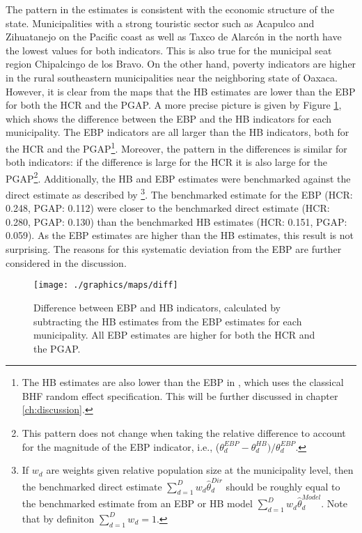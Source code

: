 The pattern in the estimates is consistent with the economic structure of the state.
Municipalities with a strong touristic sector such as Acapulco and Zihuatanejo on the Pacific coast as well as Taxco de Alarcón in the north have the lowest values for both indicators.
This is also true for the municipal seat region Chipalcingo de los Bravo.
On the other hand, poverty indicators are higher in the rural southeastern municipalities near the neighboring state of Oaxaca.
However, it is clear from the maps that the HB estimates are lower than the EBP for both the HCR and the PGAP.
A more precise picture is given by Figure \ref{fig:diff}, which shows the difference between the EBP and the HB indicators for each municipality.
The EBP indicators are all larger than the HB indicators, both for the HCR and the PGAP\footnote{The HB estimates are also lower than the EBP in \cite{morelli_hierarchical_2021}, which uses the classical BHF random effect specification. This will be further discussed in chapter \ref{ch:discussion}.}.
Moreover, the pattern in the differences is similar for both indicators: if the difference is large for the HCR it is also large for the PGAP\footnote{This pattern does not change when taking the relative difference to account for the magnitude of the EBP indicator, i.e., ($\theta_d^{EBP} - \theta_d^{HB}) / \theta_d^{EBP}$.}.
Additionally, the HB and EBP estimates were benchmarked against the direct estimate as described by \cite{pfeffermann_new_2013}\footnote{If $w_d$ are weights given relative population size at the municipality level, then the benchmarked direct estimate $\sum_{d=1}^D w_d \hat \theta_d^{Dir} $ should be roughly equal to the benchmarked estimate from an EBP or HB model $\sum_{d=1}^D w_d \hat \theta_d^{Model} $.
Note that by definiton $\sum_{d=1}^D w_d = 1$.}.
The benchmarked estimate for the EBP (HCR: 0.248, PGAP: 0.112) were closer to the benchmarked direct estimate (HCR: 0.280, PGAP: 0.130) than the benchmarked HB estimates (HCR: 0.151, PGAP: 0.059).
As the EBP estimates are higher than the HB estimates, this result is not surprising.
The reasons for this systematic deviation from the EBP are further considered in the discussion.

\begin{figure}
    \centering
    \texttt{[image: ./graphics/maps/diff]}
    \caption[Difference between EBP and HB estimates.]{Difference between EBP and HB indicators, calculated by subtracting the HB estimates from the EBP estimates for each municipality. All EBP estimates are higher for both the HCR and the PGAP.}
    \label{fig:diff}
\end{figure}

